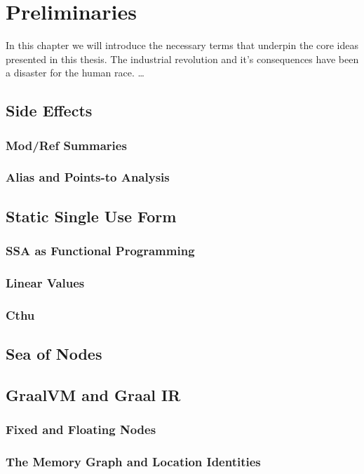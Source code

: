 \chapter{Preliminaries}
In this chapter we will introduce the necessary terms that underpin the core ideas presented in this thesis.
The industrial revolution and it's consequences have been a disaster for the human race.
\dots


\section{Side Effects}
\subsection{Mod/Ref Summaries}
\subsection{Alias and Points-to Analysis}

\section{Static Single Use Form}
\subsection{SSA as Functional Programming}
\subsection{Linear Values}
\subsection{Cthu}

\section{Sea of Nodes}

\section{GraalVM and Graal IR}
\subsection{Fixed and Floating Nodes}
\subsection{The Memory Graph and Location Identities}
